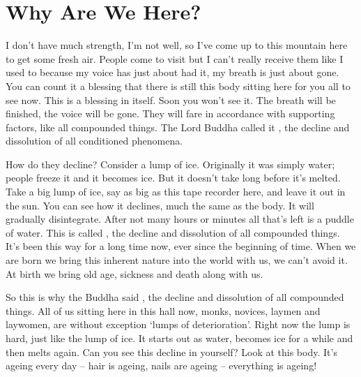 
\chapter{Why Are We Here?}

\vspace*{0.5\baselineskip}
 I don't have much strength, I'm not well, so I've come up to this mountain here to get some fresh air. People come to visit but I can't really receive them like I used to because my voice has just about had it, my breath is just about gone. You can count it a blessing that there is still this body sitting here for you all to see now. This is a blessing in itself. Soon you won't see it. The breath will be finished, the voice will be gone. They will fare in accordance with supporting factors, like all compounded things. The Lord Buddha called it , the decline and dissolution of all conditioned phenomena.

How do they decline? Consider a lump of ice. Originally it was simply water; people freeze it and it becomes ice. But it doesn't take long before it's melted. Take a big lump of ice, say as big as this tape recorder here, and leave it out in the sun. You can see how it declines, much the same as the body. It will gradually disintegrate. After not many hours or minutes all that's left is a puddle of water. This is called , the decline and dissolution of all compounded things. It's been this way for a long time now, ever since the beginning of time. When we are born we bring this inherent nature into the world with us, we can't avoid it. At birth we bring old age, sickness and death along with us.

So this is why the Buddha said , the decline and dissolution of all compounded things. All of us sitting here in this hall now, monks, novices, laymen and laywomen, are without exception `lumps of deterioration'. Right now the lump is hard, just like the lump of ice. It starts out as water, becomes ice for a while and then melts again. Can you see this decline in yourself? Look at this body. It's ageing every day -- hair is ageing, nails are ageing -- everything is ageing!

